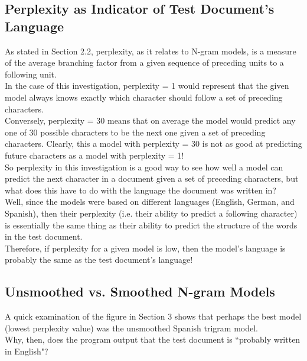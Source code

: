 \documentclass[a4,10pt]{article}
\begin{document}
\subsection{Perplexity as Indicator of Test Document's Language}

As stated in Section 2.2, perplexity, as it relates to N-gram models, is a measure of the average branching factor from a given sequence of preceding units to a following unit. \\

In the case of this investigation, perplexity = 1 would represent that the given model always knows exactly which character should follow a set of preceding characters. \\

Conversely, perplexity = 30 means that on average the model would predict any one of 30 possible characters to be the next one given a set of preceding characters. Clearly, this a model with perplexity = 30 is not as good at predicting future characters as a model with perplexity = 1! \\

So perplexity in this investigation is a good way to see how well a model can predict the next character in a document given a set of preceding characters, but what does this have to do with the language the document was written in? \\

Well, since the models were based on different languages (English, German, and Spanish), then their perplexity (i.e. their ability to predict a following character) is essentially the same thing as their ability to predict the structure of the words in the test document. \\

Therefore, if perplexity for a given model is low, then the model's language is probably the same as the test document's language!

\subsection{Unsmoothed vs. Smoothed N-gram Models}

A quick examination of the figure in Section 3 shows that perhaps the best model (lowest perplexity value) was the unsmoothed Spanish trigram model. \\

Why, then, does the program output that the test document is ``probably written in English"? \\
\end{document}
